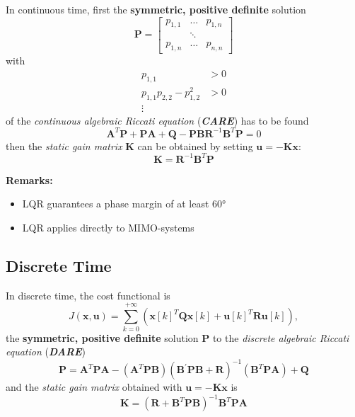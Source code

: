 In continuous time, first the \textbf{symmetric, positive definite} solution
\begin{equation*}
    \mathbf{P}=\begin{bmatrix} p_{1,1} & \dots  & p_{1,n} \\
                        & \ddots &         \\
                p_{1,n} & \dots  & p_{n,n}
    \end{bmatrix}
\end{equation*}
with
\begin{align*}
    p_{1,1}                   & >0 \\
    p_{1,1}p_{2,2} -p_{1,2}^2 & >0 \\
    \vdots
\end{align*}
of the \textit{continuous algebraic Riccati equation} (\textbf{\textit{CARE}}) has to be found
\noindent\begin{equation*}
    \mathbf{A}^T \mathbf{P}+\mathbf{PA}+\mathbf{Q}-\mathbf{PBR}^{-1}\mathbf{B}^T \mathbf{P}=0
\end{equation*}
then the \textit{static gain matrix} $\mathbf{K}$ can be obtained by setting $\mathbf{u} = -\mathbf{Kx}$:
\noindent\begin{equation*}
    \mathbf{K}=\mathbf{R}^{-1}\mathbf{B}^T \mathbf{P}
\end{equation*}

\textbf{Remarks:}

\begin{itemize}
    \item LQR guarantees a phase margin of at least 60°
    \item LQR applies directly to MIMO-systems
\end{itemize}

\newpar{}
\textbf{} 


\subsection{Discrete Time}
In discrete time, the cost functional is
\noindent\begin{equation*}
    J(\mathbf{x,u})=\sum_{k=0}^{+\infty}\left({\mathbf{x}[k]}^T \mathbf{Qx}[k]+{\mathbf{u}[k]}^T \mathbf{Ru}[k]\right),
\end{equation*}
the \textbf{symmetric, positive definite} solution $\mathbf{P}$ to the \textit{discrete algebraic Riccati equation} (\textbf{\textit{DARE}})
\noindent\begin{equation*}
    \mathbf{P}=\mathbf{A}^T \mathbf{PA}-(\mathbf{A}^T \mathbf{PB}){(\mathbf{B}^{\prime}\mathbf{PB}+\mathbf{R})}^{-1}(\mathbf{B}^T \mathbf{PA})+\mathbf{Q}
\end{equation*}
and the \textit{static gain matrix} obtained with $\mathbf{u} = -\mathbf{Kx}$ is
\noindent\begin{equation*}
    \mathbf{K}={(\mathbf{R}+\mathbf{B}^T \mathbf{PB})}^{-1}\mathbf{B}^T \mathbf{PA}
\end{equation*}

